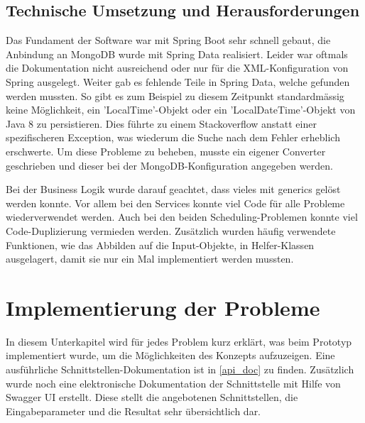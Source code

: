 \subsection{Technische Umsetzung und Herausforderungen}
Das Fundament der Software war mit Spring Boot \cite{spring_boot} sehr schnell gebaut, die Anbindung an MongoDB wurde mit Spring Data \cite{spring_data} realisiert. Leider war 
oftmals die Dokumentation nicht ausreichend oder nur für die XML-Konfiguration von Spring ausgelegt. Weiter gab es fehlende Teile in Spring Data, welche gefunden werden mussten. 
So gibt es zum Beispiel zu diesem Zeitpunkt standardmässig keine Möglichkeit, ein 'LocalTime'-Objekt oder ein 'LocalDateTime'-Objekt von Java 8 zu persistieren. Dies führte zu einem 
Stackoverflow anstatt einer spezifischeren Exception, was wiederum die Suche nach dem Fehler erheblich erschwerte. Um diese Probleme zu beheben, musste ein eigener Converter 
geschrieben und dieser bei der MongoDB-Konfiguration angegeben werden.

Bei der Business Logik wurde darauf geachtet, dass vieles mit \gls{generics} gelöst werden konnte. Vor allem bei den Services konnte viel Code für alle Probleme wiederverwendet werden. Auch 
bei den beiden Scheduling-Problemen konnte viel Code-Duplizierung vermieden werden. Zusätzlich wurden häufig verwendete Funktionen, wie das Abbilden auf die Input-Objekte, in 
Helfer-Klassen ausgelagert, damit sie nur ein Mal implementiert werden mussten.

\section{Implementierung der Probleme}\label{impl_problems}
In diesem Unterkapitel wird für jedes Problem kurz erklärt, was beim Prototyp implementiert wurde, um die Möglichkeiten des Konzepts aufzuzeigen. Eine ausführliche 
Schnittstellen-Dokumentation ist in \autoref{api_doc} zu finden. Zusätzlich wurde noch eine elektronische Dokumentation der Schnittstelle mit Hilfe von Swagger UI \cite{swagger} erstellt. 
Diese stellt die angebotenen Schnittstellen, die Eingabeparameter und die Resultat sehr übersichtlich dar.

